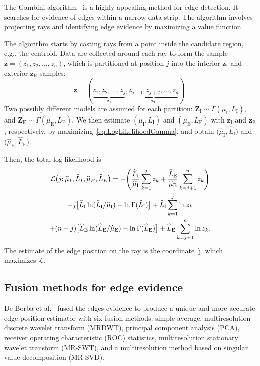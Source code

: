 \documentclass{article}
\begin{document}
The Gambini algorithm~\cite{Gambini2007} is a highly appealing method for edge detection. 
It searches for evidence of edges within a narrow data strip. 
The algorithm involves projecting rays and identifying edge evidence by maximizing a value function.

The algorithm starts by casting rays from a point inside the candidate region, e.g., the centroid.
Data are collected around each ray to form the sample $\bm z = (z_1,z_2,\dots,z_n)$, which is partitioned at position $j$ into the interior $\bm z_\text{I}$ and exterior $\bm z_\text{E}$ samples:
$$
\bm z = (\underbrace{z_1,z_2,\dots,z_j}_{\bm z_\text{I}}, 
\underbrace{z_{j+1}, z_{j+2},\dots,z_n}_{\bm z_\text{E}}).
$$
Two possibly different models are assumed for each partition:
$\bm Z_\text{I} \sim \Gamma(\mu_\text{I},L_\text{I})$, and 
$\bm Z_\text{E} \sim \Gamma(\mu_\text{E},L_\text{E})$.
We then estimate $(\mu_\text{I},L_\text{I})$ and $(\mu_\text{E},L_\text{E})$ with $\bm z_\text{I}$ and $\bm z_\text{E}$, respectively, by maximizing~\eqref{eq:LogLikelihoodGamma}, and obtain $\big(\widehat{\mu}_\text{I}, \widehat{L}_\text{I}\big)$ and $\big(\widehat{\mu}_\text{E}, \widehat{L}_\text{E}\big)$.

Then, the total log-likelihood is
\begin{multline}\label{eq:TotalLogLikelihood}
\mathcal L\big(j;\widehat{\mu}_I, \widehat{L}_I,\widehat{\mu}_E, \widehat{L}_E\big)= -\Bigg(
	\frac{\widehat{L}_\text{I}}{\widehat{\mu}_\text{I}}\sum_{k=1}^{j} z_k +
	\frac{\widehat{L}_\text{E}}{\widehat{\mu}_\text{E}}\sum_{k=j+1}^{n} z_k  
	\Bigg)\mbox{}\\
+j \big[\widehat{L}_\text{I}\ln (\widehat{L}_\text{I} / \widehat{\mu}_\text{I}) - \ln \Gamma(\widehat{L}_\text{I})\big]
+\widehat{L}_\text{I} \sum_{k=1}^{j}\ln z_k  \mbox{}\\
+(n-j) \big[\widehat{L}_\text{E}\ln (\widehat{L}_\text{E} / \widehat{\mu}_\text{E}) - \ln \Gamma(\widehat{L}_\text{E})\big]
+\widehat{L}_\text{E} \sum_{k=j+1}^{n}\ln z_k .%
\raisetag{2.2em}
\end{multline}
The estimate of the edge position on the ray is the coordinate  $\widehat\jmath$ which maximizes $\mathcal L$.

\subsection{Fusion methods for edge evidence}
De Borba et al.~\cite{DeBorba2020,FeatureSelectionforEdgeDetectioninPolSARImages} fused the edges evidence to produce a unique and more accurate edge position estimator with six fusion methods: simple average, multiresolution discrete wavelet transform (MRDWT), principal component analysis (PCA), receiver operating characteristic (ROC) statistics, multiresolution stationary wavelet transform (MR-SWT), and a multiresolution method based on singular value decomposition (MR-SVD).
\end{document}
